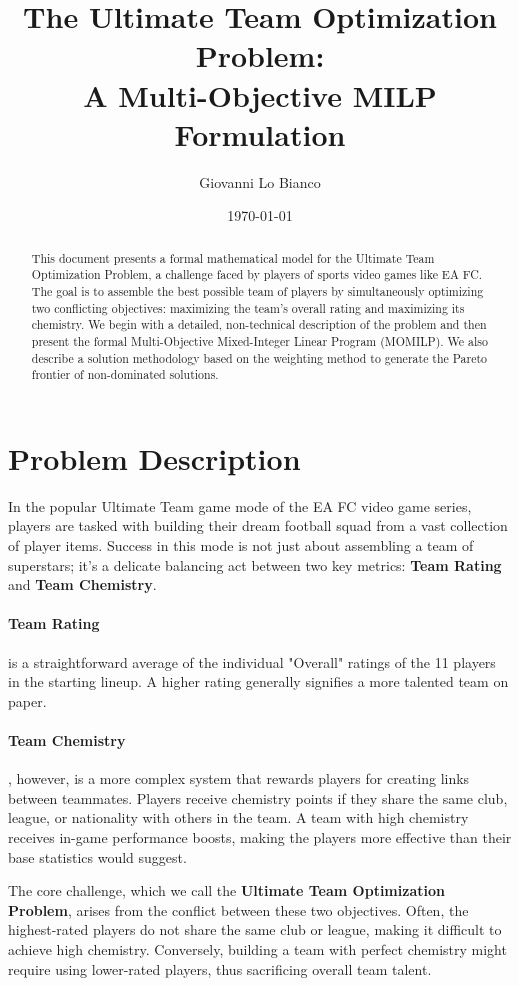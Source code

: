 \documentclass{article}
\title{The Ultimate Team Optimization Problem: \\ A Multi-Objective MILP Formulation}
\author{Giovanni Lo Bianco}
\date{\today}
\begin{document}
\maketitle

\begin{abstract}
This document presents a formal mathematical model for the Ultimate Team Optimization Problem, a challenge faced by players of sports video games like EA FC. The goal is to assemble the best possible team of players by simultaneously optimizing two conflicting objectives: maximizing the team's overall rating and maximizing its chemistry. We begin with a detailed, non-technical description of the problem and then present the formal Multi-Objective Mixed-Integer Linear Program (MOMILP). We also describe a solution methodology based on the weighting method to generate the Pareto frontier of non-dominated solutions.
\end{abstract}

\section{Problem Description}
In the popular Ultimate Team game mode of the EA FC video game series, players are tasked with building their dream football squad from a vast collection of player items. Success in this mode is not just about assembling a team of superstars; it's a delicate balancing act between two key metrics: \textbf{Team Rating} and \textbf{Team Chemistry}.

\paragraph{Team Rating} is a straightforward average of the individual "Overall" ratings of the 11 players in the starting lineup. A higher rating generally signifies a more talented team on paper.

\paragraph{Team Chemistry}, however, is a more complex system that rewards players for creating links between teammates. Players receive chemistry points if they share the same club, league, or nationality with others in the team. A team with high chemistry receives in-game performance boosts, making the players more effective than their base statistics would suggest.

The core challenge, which we call the \textbf{Ultimate Team Optimization Problem}, arises from the conflict between these two objectives. Often, the highest-rated players do not share the same club or league, making it difficult to achieve high chemistry. Conversely, building a team with perfect chemistry might require using lower-rated players, thus sacrificing overall team talent.
\end{document}
